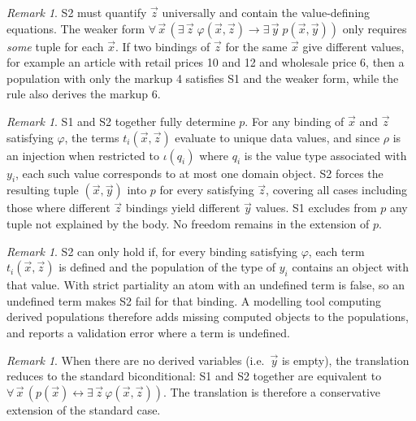 \documentclass[11pt]{amsart}
\theoremstyle{definition}
\theoremstyle{remark}
\newtheorem{remark}[theorem]{Remark}
\begin{document}
\begin{remark}
S2 must quantify $\vec{z}$ universally and contain the value-defining
equations. The weaker form $\forall\, \vec{x}\, (\exists\, \vec{z}\;
\varphi(\vec{x}, \vec{z}) \to \exists\, \vec{y}\; p(\vec{x}, \vec{y}))$
only requires \emph{some} tuple for each $\vec{x}$. If two bindings of
$\vec{z}$ for the same $\vec{x}$ give different values, for example an
article with retail prices 10 and 12 and wholesale price 6, then a
population with only the markup 4 satisfies S1 and the weaker form, while
the rule also derives the markup 6.
\end{remark}

\begin{remark}
S1 and S2 together fully determine $p$. For any binding of $\vec{x}$ and
$\vec{z}$ satisfying $\varphi$, the terms $t_i(\vec{x}, \vec{z})$ evaluate
to unique data values, and since $\rho$ is an injection when restricted to
$\iota(q_i)$ where $q_i$ is the value type associated with $y_i$, each such value
corresponds to at most one domain object. S2 forces the resulting tuple
$(\vec{x}, \vec{y})$ into $p$ for every satisfying $\vec{z}$, covering
all cases including those where different $\vec{z}$ bindings yield
different $\vec{y}$ values. S1 excludes from $p$ any tuple not explained
by the body. No freedom remains in the extension of $p$.
\end{remark}

\begin{remark}
S2 can only hold if, for every binding satisfying $\varphi$, each term
$t_i(\vec{x}, \vec{z})$ is defined and the population of the type of $y_i$
contains an object with that value. With strict partiality an atom with an
undefined term is false, so an undefined term makes S2 fail for that
binding. A modelling tool computing derived populations therefore adds
missing computed objects to the populations, and reports a validation error
where a term is undefined.
\end{remark}

\begin{remark}
When there are no derived variables (i.e.\ $\vec{y}$ is empty), the
translation reduces to the standard biconditional: S1 and S2 together are
equivalent to $\forall\, \vec{x}\, (p(\vec{x}) \leftrightarrow \exists\,
\vec{z}\, \varphi(\vec{x}, \vec{z}))$. The translation is therefore a
conservative extension of the standard case.
\end{remark}
\end{document}

